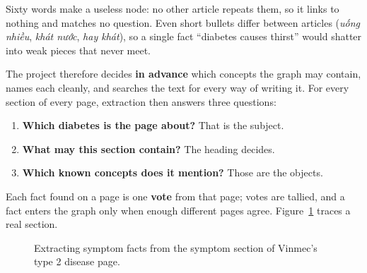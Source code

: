 \documentclass[11pt, a4paper]{article}
\begin{document}
Sixty words make a useless node: no other article repeats them, so it links to nothing and matches no question. Even short bullets differ between articles (\emph{uống nhiều}, \emph{khát nước}, \emph{hay khát}), so a single fact ``diabetes causes thirst'' would shatter into weak pieces that never meet.

The project therefore decides \textbf{in advance} which concepts the graph may contain, names each cleanly, and searches the text for every way of writing it. For every section of every page, extraction then answers three questions:
\begin{enumerate}
    \item \textbf{Which diabetes is the page about?} That is the subject.
    \item \textbf{What may this section contain?} The heading decides.
    \item \textbf{Which known concepts does it mention?} Those are the objects.
\end{enumerate}
Each fact found on a page is one \textbf{vote} from that page; votes are tallied, and a fact enters the graph only when enough different pages agree. Figure~\ref{fig:pipeline} traces a real section.

\begin{figure}[H]
\centering
{}
\caption{Extracting symptom facts from the symptom section of Vinmec's type 2 disease page.}
\label{fig:pipeline}
\end{figure}
\end{document}
